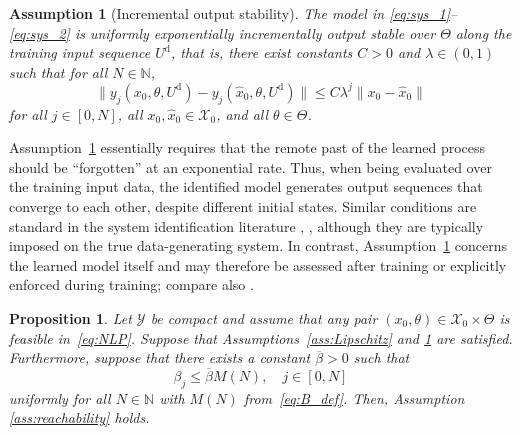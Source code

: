 \documentclass[a4paper,fleqn]{cas-dc}
\newtheorem{ass}{Assumption}
\newtheorem{prop}{Proposition}
\begin{document}
\begin{ass}[Incremental output stability]\label{ass:output_stability}
	The model in \eqref{eq:sys_1}--\eqref{eq:sys_2} is uniformly exponentially incrementally output stable over $\Theta$ along the training input sequence $U^\mathrm{d}$, that is, there exist constants $C>0$ and $\lambda\in(0,1)$ such that for all $N\in\mathbb{N}$,
	\begin{equation}
		\|y_j({x}_0,{\theta},U^\mathrm{d})-y_j(\hat{x}_0,{\theta},U^\mathrm{d})\| \leq C\lambda^j\|{x}_0-\hat{x}_0\| \label{eq:output_stability}
	\end{equation}
	for all $j\in[0,N]$, all $x_0,\hat{x}_0\in\mathcal{X}_0$, and all $\theta\in\Theta$.
\end{ass}

Assumption~\ref{ass:output_stability} essentially requires that the remote past of the learned process should be ``forgotten'' at an exponential rate. Thus, when being evaluated over the training input data, the identified model generates output sequences that converge to each other, despite different initial states.
Similar conditions are standard in the system identification literature \cite[Cond.~S3]{Ljung1978}, \cite[Cond.~1]{Beintema2023a}, although they are typically imposed on the true data-generating system.
In contrast, Assumption~\ref{ass:output_stability} concerns the learned model itself and may therefore be assessed after training or explicitly enforced during training; compare also \cite[Sec.~4.2]{Schiller2025b}.

\begin{prop}\label{prop:reachability}
	Let $\mathcal{Y}$ be compact and assume that any pair $(x_0,\theta)\in\mathcal{X}_0\times\Theta$ is feasible in~\eqref{eq:NLP}. Suppose that Assumptions~\ref{ass:Lipschitz} and \ref{ass:output_stability} are satisfied. Furthermore, suppose that there exists a constant $\overline{\beta}>0$ such that
	\begin{equation}\label{eq:beta_upper_bound}
		\beta_j \leq \overline{\beta} M(N), \quad j\in[0,N]
	\end{equation}
	uniformly for all $N\in\mathbb{N}$ with $M(N)$ from~\eqref{eq:B_def}.
	Then, Assumption \ref{ass:reachability} holds.
\end{prop}
\end{document}
